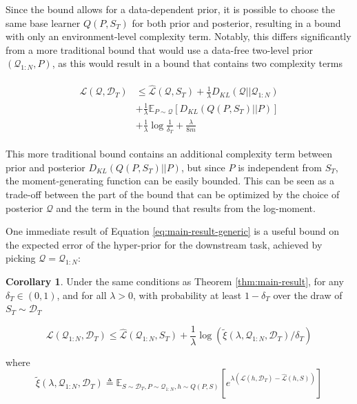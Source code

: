 \documentclass[letterpaper]{article} %
\theoremstyle{definition}
\newtheorem{corollary}[theorem]{Corollary}
\newcommand{\Expect}[2]{\mathbb{E}_{#1}\left [#2 \right ]}
\begin{document}
Since the bound allows for a data-dependent prior, it is possible to choose the same base learner $Q(P, S_T)$ for both prior and posterior, resulting in a bound with only an environment-level complexity term. 
Notably, this differs significantly from a more traditional bound that would use a data-free two-level prior $(\mathcal{Q}_{1:N}, P)$, as this would result in a bound that contains two complexity terms

\begin{align*}
\begin{split}
\mathcal{L}(\mathcal{Q}, \mathcal{D}_T) &\leq \hat{\mathcal{L}}(\mathcal{Q}, S_T) 
+ \frac{1}{\lambda}D_{KL}(\mathcal{Q}||\mathcal{Q}_{1:N}) \\
&+ \frac{1}{\lambda}\Expect{P\sim \mathcal{Q}}{D_{KL}(Q(P,S_T)||P)}\\
&+\frac{1}{\lambda}\log\frac{1}{\delta_T}+\frac{\lambda}{8m}
\end{split}
\end{align*}

This more traditional bound contains an additional complexity term between prior and posterior $D_{KL}(Q(P,S_T)||P)$, but since $P$ is independent from $S_T$, the moment-generating function can be easily bounded. This can be seen as a trade-off between the part of the bound that can be optimized by the choice of posterior $\mathcal{Q}$ and the term in the bound that results from the log-moment.

One immediate result of Equation \ref{eq:main-result-generic} is a useful bound on the expected error of the hyper-prior for the downstream task, achieved by picking $\mathcal{Q}=\mathcal{Q}_{1:N}$:

\begin{corollary} \label{thm:corollary-base}
	Under the same conditions as Theorem \ref{thm:main-result},
	for any $\delta_T \in (0,1)$, and for all $\lambda>0$, with probability at least $1-\delta_T$ over the draw of $S_T\sim \mathcal{D}_T$
	
	$$\mathcal{L}(\mathcal{Q}_{1:N}, \mathcal{D}_T) \leq \hat{\mathcal{L}}(\mathcal{Q}_{1:N}, S_T)
	+\frac{1}{\lambda}\log\left (\tilde{\xi}(\lambda,\mathcal{Q}_{1:N},\mathcal{D}_T)/\delta_T\right )$$
	
	where 
	$$\tilde{\xi}(\lambda,\mathcal{Q}_{1:N},\mathcal{D}_T)\triangleq \Expect{S\sim \mathcal{D}_T, P\sim \mathcal{Q}_{1:N}, h\sim Q(P,S)}{e^{\lambda\left (\mathcal{L}(h, \mathcal{D}_T)-\hat{\mathcal{L}}(h, S)\right )}}$$
\end{corollary}
\end{document}
